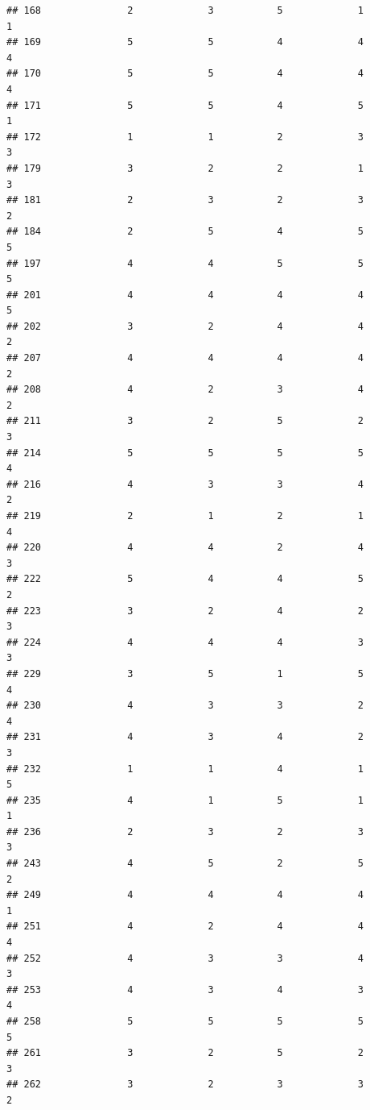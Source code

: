 \documentclass[
]{article}
\begin{document}
\begin{verbatim}
## 168               2             3           5             1            1
## 169               5             5           4             4            4
## 170               5             5           4             4            4
## 171               5             5           4             5            1
## 172               1             1           2             3            3
## 179               3             2           2             1            3
## 181               2             3           2             3            2
## 184               2             5           4             5            5
## 197               4             4           5             5            5
## 201               4             4           4             4            5
## 202               3             2           4             4            2
## 207               4             4           4             4            2
## 208               4             2           3             4            2
## 211               3             2           5             2            3
## 214               5             5           5             5            4
## 216               4             3           3             4            2
## 219               2             1           2             1            4
## 220               4             4           2             4            3
## 222               5             4           4             5            2
## 223               3             2           4             2            3
## 224               4             4           4             3            3
## 229               3             5           1             5            4
## 230               4             3           3             2            4
## 231               4             3           4             2            3
## 232               1             1           4             1            5
## 235               4             1           5             1            1
## 236               2             3           2             3            3
## 243               4             5           2             5            2
## 249               4             4           4             4            1
## 251               4             2           4             4            4
## 252               4             3           3             4            3
## 253               4             3           4             3            4
## 258               5             5           5             5            5
## 261               3             2           5             2            3
## 262               3             2           3             3            2

\end{verbatim}
\end{document}
